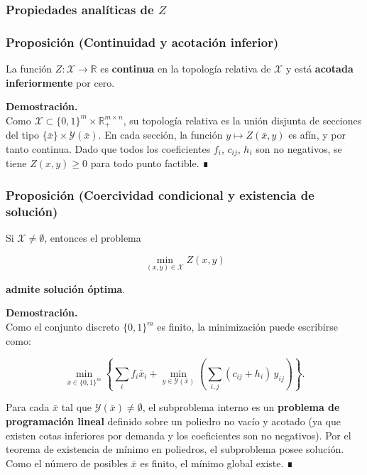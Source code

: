 \documentclass[
  spanish,
  us-letterpaper,
  DIV=11,
  numbers=noendperiod]{scrreprt}
\numberwithin{equation}{section}
\begin{document}
\subsubsection{\texorpdfstring{\textbf{Propiedades analíticas de
\(Z\)}}{Propiedades analíticas de Z}}\label{propiedades-analuxedticas-de-z}

\subsubsection{\texorpdfstring{\textbf{Proposición (Continuidad y
acotación
inferior)}}{Proposición (Continuidad y acotación inferior)}}\label{proposiciuxf3n-continuidad-y-acotaciuxf3n-inferior}

La función \(Z : \mathcal{X} \to \mathbb{R}\) es \textbf{continua} en la
topología relativa de \(\mathcal{X}\) y está \textbf{acotada
inferiormente} por cero.

\textbf{Demostración.}\\
Como \(\mathcal{X} \subset \{0,1\}^m \times \mathbb{R}_+^{m \times n}\),
su topología relativa es la unión disjunta de secciones del tipo
\(\{\bar{x}\} \times \mathcal{Y}(\bar{x})\). En cada sección, la función
\(y \mapsto Z(\bar{x}, y)\) es afín, y por tanto continua. Dado que
todos los coeficientes \(f_i\), \(c_{ij}\), \(h_i\) son no negativos, se
tiene \(Z(x, y) \ge 0\) para todo punto factible. ∎

\subsubsection{\texorpdfstring{\textbf{Proposición (Coercividad
condicional y existencia de
solución)}}{Proposición (Coercividad condicional y existencia de solución)}}\label{proposiciuxf3n-coercividad-condicional-y-existencia-de-soluciuxf3n}

Si \(\mathcal{X} \ne \emptyset\), entonces el problema

\[
\min_{(x, y) \in \mathcal{X}} Z(x, y)
\]

\textbf{admite solución óptima}.

\textbf{Demostración.}\\
Como el conjunto discreto \(\{0,1\}^m\) es finito, la minimización puede
escribirse como:

\[
\min_{\bar{x} \in \{0,1\}^m}
\left\{
\sum_i f_i \bar{x}_i
+
\min_{y \in \mathcal{Y}(\bar{x})}
\left(
\sum_{i,j} (c_{ij} + h_i)\, y_{ij}
\right)
\right\}.
\]

Para cada \(\bar{x}\) tal que \(\mathcal{Y}(\bar{x}) \ne \emptyset\), el
subproblema interno es un \textbf{problema de programación lineal}
definido sobre un poliedro no vacío y acotado (ya que existen cotas
inferiores por demanda y los coeficientes son no negativos). Por el
teorema de existencia de mínimo en poliedros, el subproblema posee
solución. Como el número de posibles \(\bar{x}\) es finito, el mínimo
global existe. ∎
\end{document}
